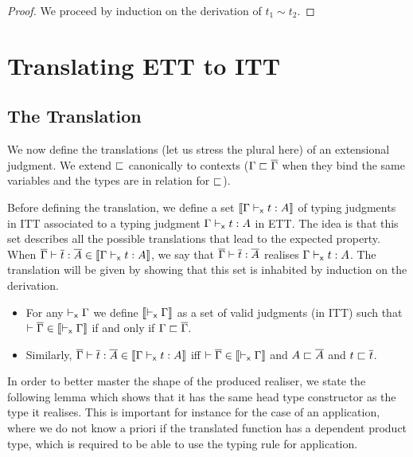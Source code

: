 \begin{proof}
  We proceed by induction on the derivation of $t_1 \sim t_2$.
\end{proof}

\section{Translating ETT to ITT}
\label{sec:translation}

\subsection{The Translation}
\label{sec:the-translation}

We now define the translations (let us stress the plural here) of an
extensional judgment. We extend $\sqsubset$ canonically to contexts
($\Gamma \sqsubset \overline{\Gamma}$ when they bind the same variables and the types are in
relation for $\sqsubset$).

Before defining the translation, we define a set
$\llbracket \Gamma \vdash_{\mathsf{x}} t : A \rrbracket$ of typing judgments
in ITT associated to a typing judgment $\Gamma \vdash_{\mathsf{x}} t : A$ in ETT.
%
The idea is that this set describes all the possible translations that
lead to the expected property. When
$\overline{\Gamma} \vdash \overline{t} : \overline{A} \in \llbracket \Gamma \vdash_{\mathsf{x}} t : A \rrbracket$, we say that
$\overline{\Gamma} \vdash \overline{t} : \overline{A}$ realises $\Gamma \vdash_{\mathsf{x}} t : A$. The
translation will be given by showing that this set is inhabited by
induction on the derivation.

\begin{definition}
  \leavevmode
  \begin{itemize}
    \item For any $\vdash_{\mathsf{x}} \Gamma$ we define $\llbracket \vdash_{\mathsf{x}} \Gamma \rrbracket$ as a set of
    valid judgments (in ITT) such that
    $\vdash \overline{\Gamma} \in \llbracket \vdash_{\mathsf{x}} \Gamma \rrbracket$ if and only if $\Gamma \sqsubset \overline{\Gamma}$.

    \item Similarly, $\overline{\Gamma} \vdash \overline{t} : \overline{A} \in \llbracket \Gamma \vdash_{\mathsf{x}} t : A \rrbracket$ iff
    $\vdash \overline{\Gamma} \in \llbracket \vdash_{\mathsf{x}} \Gamma \rrbracket$ and $A \sqsubset \overline{A}$ and $t \sqsubset \overline{t}$.
  \end{itemize}
\end{definition}

In order to better master the shape of the produced realiser, we state the
following lemma which shows that it has the same head
type constructor as the type it realises.
%
This is important for instance for the case of an application, where we
do not know a priori if the translated function has a dependent product
type, which is required to be able to use the typing rule for application.


